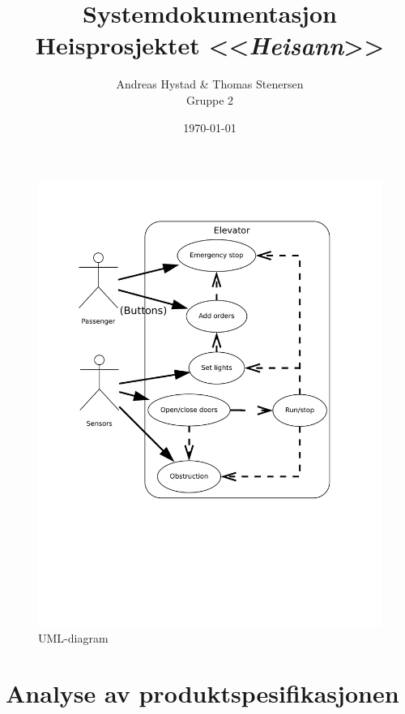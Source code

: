 \documentclass[a4paper,titlepage]{scrartcl}
\begin{document}
\title{Systemdokumentasjon \\ Heisprosjektet <<\emph{Heisann}>>}
\author{Andreas Hystad \& Thomas Stenersen \\ Gruppe 2}
\date{\today}
\maketitle

\begin{figure}[h]
\centering
\includegraphics[scale=.5]{uml_shait.pdf}
\caption{UML-diagram}
\end{figure}
\section{Analyse av produktspesifikasjonen}
\end{document}
